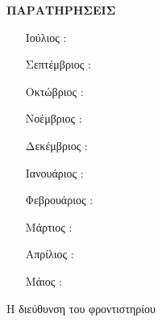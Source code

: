\documentclass[a4paper,11pt,landscape]{article}
\begin{document}
\newpage
\begin{center}
{\large \textbf{ΠΑΡΑΤΗΡΗΣΕΙΣ}}\\\vspace{1cm}
\begin{enumerate}[leftmargin=20mm, itemsep=4mm]
\item[Ιούλιος]: \dotfill
\item[Σεπτέμβριος]: \dotfill
\item[Οκτώβριος]: \dotfill
\item[Νοέμβριος]: \dotfill
\item[Δεκέμβριος]: \dotfill
\item[Ιανουάριος]: \dotfill
\item[Φεβρουάριος]: \dotfill
\item[Μάρτιος]: \dotfill
\item[Απρίλιος]: \dotfill
\item[Μάιος]: \dotfill
\end{enumerate}
\vfill
{\large Η διεύθυνση του φροντιστηρίου}
\end{center}
\end{document}
